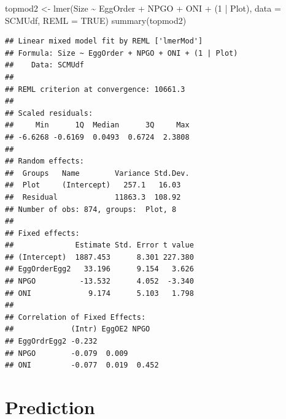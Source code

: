 \documentclass[
]{article}
\newenvironment{Shaded}{\begin{snugshade}}{\end{snugshade}}
\newcommand{\AttributeTok}[1]{\textcolor[rgb]{0.77,0.63,0.00}{#1}}
\newcommand{\ConstantTok}[1]{\textcolor[rgb]{0.00,0.00,0.00}{#1}}
\newcommand{\DecValTok}[1]{\textcolor[rgb]{0.00,0.00,0.81}{#1}}
\newcommand{\FunctionTok}[1]{\textcolor[rgb]{0.00,0.00,0.00}{#1}}
\newcommand{\NormalTok}[1]{#1}
\newcommand{\OtherTok}[1]{\textcolor[rgb]{0.56,0.35,0.01}{#1}}
\newcommand{\SpecialCharTok}[1]{\textcolor[rgb]{0.00,0.00,0.00}{#1}}
\begin{document}
\begin{Shaded}
\begin{Highlighting}[]
\NormalTok{topmod2 }\OtherTok{\textless{}{-}} \FunctionTok{lmer}\NormalTok{(Size }\SpecialCharTok{\textasciitilde{}}\NormalTok{ EggOrder }\SpecialCharTok{+}\NormalTok{ NPGO }\SpecialCharTok{+}\NormalTok{ ONI }\SpecialCharTok{+}\NormalTok{ (}\DecValTok{1} \SpecialCharTok{|}\NormalTok{ Plot), }\AttributeTok{data =}\NormalTok{ SCMUdf, }\AttributeTok{REML =} \ConstantTok{TRUE}\NormalTok{)}
\FunctionTok{summary}\NormalTok{(topmod2)}
\end{Highlighting}
\end{Shaded}

\begin{verbatim}
## Linear mixed model fit by REML ['lmerMod']
## Formula: Size ~ EggOrder + NPGO + ONI + (1 | Plot)
##    Data: SCMUdf
## 
## REML criterion at convergence: 10661.3
## 
## Scaled residuals: 
##     Min      1Q  Median      3Q     Max 
## -6.6268 -0.6169  0.0493  0.6724  2.3808 
## 
## Random effects:
##  Groups   Name        Variance Std.Dev.
##  Plot     (Intercept)   257.1   16.03  
##  Residual             11863.3  108.92  
## Number of obs: 874, groups:  Plot, 8
## 
## Fixed effects:
##              Estimate Std. Error t value
## (Intercept)  1887.453      8.301 227.380
## EggOrderEgg2   33.196      9.154   3.626
## NPGO          -13.532      4.052  -3.340
## ONI             9.174      5.103   1.798
## 
## Correlation of Fixed Effects:
##             (Intr) EggOE2 NPGO  
## EggOrdrEgg2 -0.232              
## NPGO        -0.079  0.009       
## ONI         -0.077  0.019  0.452
\end{verbatim}

\hypertarget{prediction}{%
\section{Prediction}\label{prediction}}
\end{document}
